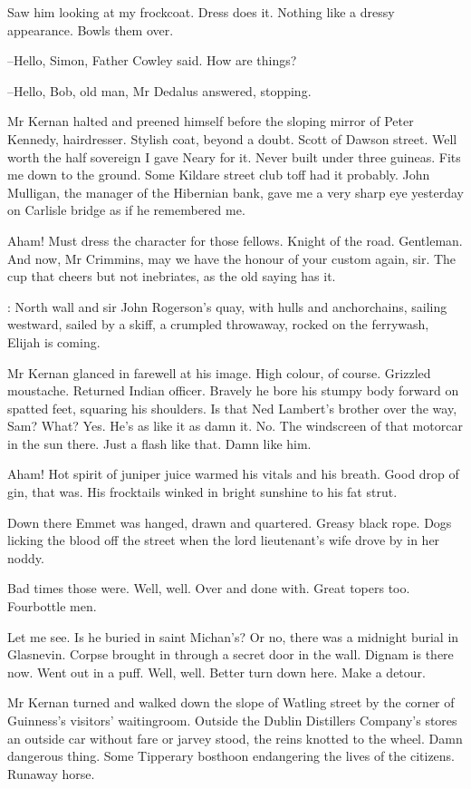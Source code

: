 Saw him looking at my frockcoat.
Dress does it.
Nothing like a dressy
appearance.
Bowls them over.

--Hello, Simon,
Father Cowley said.
How are things?

--Hello, Bob, old man,
Mr Dedalus answered,
stopping.

Mr Kernan halted and preened himself
before the sloping mirror of Peter
Kennedy, hairdresser.
Stylish coat, beyond a doubt.
Scott of Dawson
street.
Well worth the half sovereign I gave Neary for it.
Never built
under three guineas.
Fits me down to the ground.
Some Kildare street club
toff had it probably.
John Mulligan, the manager of the Hibernian bank,
gave me a very sharp eye yesterday
on Carlisle bridge as if he remembered
me.

Aham!
Must dress the character for those fellows.
Knight of the road.
Gentleman.
And now, Mr Crimmins,
may we have the honour of your custom again, sir.
The cup that cheers but not inebriates,
as the old saying has it.

:
North wall and sir John Rogerson's quay,
with hulls and anchorchains,
sailing westward,
sailed by a skiff,
a crumpled throwaway,
rocked on the
ferrywash,
Elijah is coming.

Mr Kernan glanced in farewell at his image.
High colour, of course.
Grizzled moustache.
Returned Indian officer.
Bravely he bore his stumpy body forward on spatted feet,
squaring his shoulders.
Is that Ned Lambert's brother over the way, Sam?
What?
Yes.
He's as like it as damn it.
No.
The windscreen of that motorcar in the sun there.
Just a flash like that.
Damn like him.%

Aham!
Hot spirit of juniper juice warmed his vitals and his breath.
Good
drop of gin, that was.
His frocktails winked in bright sunshine to his
fat strut.

Down there
Emmet was hanged, drawn and quartered.
Greasy black rope.
Dogs
licking the blood off the street
when the lord lieutenant's wife drove by
in her noddy.

Bad times those were.
Well, well.
Over and done with.
Great topers too.
Fourbottle men.

Let me see.
Is he buried in saint Michan's?
Or no, there was a midnight burial in Glasnevin.
Corpse brought in through a secret door in the wall.
Dignam is there now.
Went out in a puff.
Well, well.
Better turn down here.
Make a detour.

Mr Kernan turned and walked down the slope of Watling street
by the
corner of Guinness's visitors' waitingroom.
Outside the Dublin Distillers
Company's stores
an outside car without fare or jarvey stood,
the reins
knotted to the wheel.
Damn dangerous thing.
Some Tipperary bosthoon
endangering the lives of the citizens.
Runaway horse.

